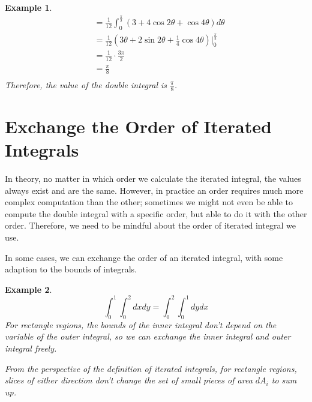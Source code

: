 \documentclass{article}
\newtheorem{example}{Example}
\begin{document}
\begin{example}
\begin{equation*}
\begin{split}
                                                     &= \frac{1}{12} \int_0^{\frac{\pi}{2}} (3 + 4\cos2\theta + \cos 4\theta) d\theta \\
                                                     &= \frac{1}{12} (3\theta + 2\sin2\theta + \frac{1}{4}\cos 4\theta)|_0^{\frac{\pi}{2}} \\
                                                     &= \frac{1}{12} \cdot \frac{3\pi}{2} \\
                                                     &= \frac{\pi}{8} \\
    \end{split}
  \end{equation*}
  Therefore, the value of the double integral is $\frac{\pi}{8}$.
\end{example}

\section{Exchange the Order of Iterated Integrals}

In theory, no matter in which order we calculate the iterated integral, the 
values always exist and are the same. However, in practice an order requires 
much more complex computation than the other; sometimes we might not even be 
able to compute the double integral with a specific order, but able to do it 
with the other order. Therefore, we need to be mindful about the order of 
iterated integral we use.

In some cases, we can exchange the order of an iterated integral, with some 
adaption to the bounds of integrals.

\begin{example}
  \begin{equation*}
    \int_0^1 \int_0^2 dx dy = \int_0^2 \int_0^1 dy dx
  \end{equation*}
  For rectangle regions, the bounds of the inner integral don't depend on the 
  variable of the outer integral, so we can exchange the inner integral and 
  outer integral freely.

  From the perspective of the definition of iterated integrals, for rectangle 
  regions, slices of either direction don't change the set of small pieces of 
  area $dA_i$ to sum up.
\end{example}
\end{document}
